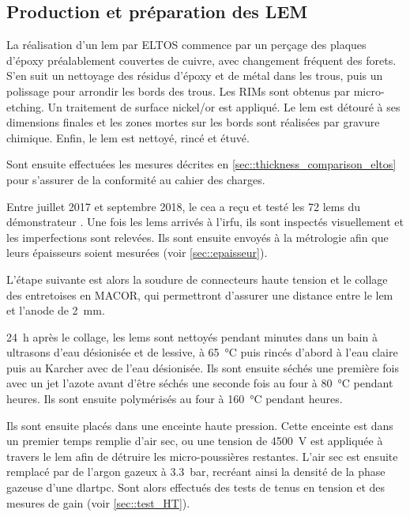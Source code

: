     \subsection{Production et préparation des LEM}
        
      La réalisation d'un \gls{lem} par ELTOS commence par un perçage des plaques d'époxy préalablement couvertes de cuivre, avec changement fréquent des forets. S'en suit un nettoyage des résidus d'époxy et de métal dans les trous, puis un polissage pour arrondir les bords des trous. Les RIMs sont obtenus par micro-etching. Un traitement de surface nickel/or est appliqué. Le \gls{lem} est détouré à ses dimensions finales  et les zones mortes sur les bords sont réalisées par gravure chimique. Enfin, le \gls{lem} est nettoyé, rincé et étuvé.
          
      Sont ensuite effectuées les mesures décrites en \autoref{sec::thickness_comparison_eltos} pour s'assurer de la conformité au cahier des charges.
      
      Entre juillet 2017 et septembre 2018, le \gls{cea} a reçu et testé les 72 \glspl{lem} du démonstrateur \SSS{}. Une fois les \glspl{lem} arrivés à l'\gls{irfu}, ils sont inspectés visuellement et les imperfections sont relevées. Ils sont ensuite envoyés à la métrologie afin que leurs épaisseurs soient mesurées (voir \autoref{sec::epaisseur}).
      
      L'étape suivante est alors la soudure de connecteurs haute tension et le collage des entretoises en MACOR, qui permettront d'assurer une distance entre le \gls{lem} et l'anode de \SI{2}{\milli\meter}.
      
      \SI{24}{\hour} après le collage, les \glspl{lem} sont nettoyés pendant  minutes dans un bain à ultrasons d'eau désionisée et de lessive, à \SI{65}{\celsius} puis rincés d'abord à l'eau claire puis au Karcher avec de l'eau désionisée. Ils sont ensuite séchés une première fois avec un jet l'azote avant d'être séchés une seconde fois au four à \SI{80}{\celsius} pendant  heures. Ils sont ensuite polymérisés au four à \SI{160}{\celsius} pendant  heures.

      Ils sont ensuite placés dans une enceinte haute pression. Cette enceinte est dans un premier temps remplie d'air sec, ou une tension de \SI{4500}{\volt} est appliquée à travers le \gls{lem} afin de détruire les micro-poussières restantes. L'air sec est ensuite remplacé par de l'argon gazeux à \SI{3.3}{\bar}, recréant ainsi la densité de la phase gazeuse d'une \gls{dlartpc}. Sont alors effectués des tests de tenus en tension et des mesures de gain (voir \autoref{sec::test_HT}).
        
